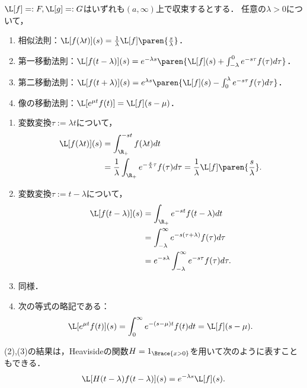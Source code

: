 \documentclass[uplatex,dvipdfmx]{jsreport}
\begin{document}
\begin{proposition}[拡大・平行移動]
    $\L[f]=:F,\L[g]=:G$はいずれも$(a,\infty)$上で収束するとする．
    任意の$\lambda>0$について，
    \begin{enumerate}
        \item 相似法則：$\L[f(\lambda t)](s)=\frac{1}{\lambda}\L[f]\paren{\frac{s}{\lambda}}$．
        \item 第一移動法則：$\L[f(t-\lambda)](s)=e^{-\lambda s}\paren{\L[f](s)+\int^0_{-\lambda}e^{-s\tau}f(\tau)d\tau}$．
        \item 第二移動法則：$\L[f(t+\lambda)](s)=e^{\lambda s}\paren{\L[f](s)-\int^\lambda_0e^{-s\tau}f(\tau)d\tau}$．
        \item 像の移動法則：$\L[e^{\mu t}f(t)]=\L[f](s-\mu)$．
    \end{enumerate}
\end{proposition}
\begin{Proof}\mbox{}
    \begin{enumerate}
        \item 変数変換$\tau:=\lambda t$について，
        \begin{align*}
            \L[f(\lambda t)](s)&=\int_{\R_+}^{-st}f(\lambda t)dt\\
            &=\frac{1}{\lambda }\int_{\R_+}e^{-\frac{s}{\lambda }\tau}f(\tau)d\tau=\frac{1}{\lambda}\L[f]\paren{\frac{s}{\lambda}}.
        \end{align*}
        \item 変数変換$\tau:=t-\lambda$について，
        \begin{align*}
            \L[f(t-\lambda)](s)&=\int_{\R_+}e^{-st}f(t-\lambda )dt\\
            &=\int_{-\lambda}^\infty e^{-s(\tau+\lambda)}f(\tau)d\tau\\
            &=e^{-s\lambda}\int^\infty_{-\lambda}e^{-s\tau}f(\tau)d\tau.
        \end{align*}
        \item 同様．
        \item 次の等式の略記である：
        \[\L[e^{\mu t}f(t)](s)=\int^\infty_0e^{-(s-\mu)t}f(t)dt=\L[f](s-\mu).\]
    \end{enumerate}
\end{Proof}
\begin{remark}
    (2),(3)の結果は，Heavisideの関数$H=1_{\Brace{x>0}}$を用いて次のように表すこともできる．
    \[\L[H(t-\lambda)f(t-\lambda)](s)=e^{-\lambda s}\L[f](s).\]
\end{remark}
\end{document}
